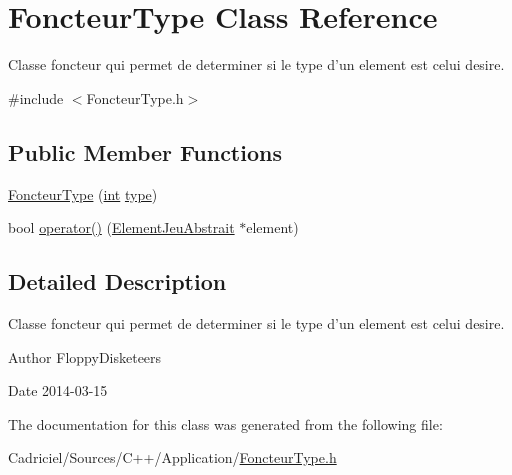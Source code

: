 \hypertarget{class_foncteur_type}{\section{Foncteur\-Type Class Reference}
\label{class_foncteur_type}
}


Classe foncteur qui permet de determiner si le type d'un element est celui desire.  




{\ttfamily \#include $<$Foncteur\-Type.\-h$>$}

\subsection*{Public Member Functions}
\begin{DoxyCompactItemize}
\item 
\hyperlink{group__inf2990_gafcde197bef3ec73b838a97b787605d46}{Foncteur\-Type} (\hyperlink{wglew_8h_a500a82aecba06f4550f6849b8099ca21}{int} \hyperlink{fmod_8h_a5338b9cb3874378d7e5adfbe80a8a381}{type})
\item 
bool \hyperlink{group__inf2990_ga133b99829c940832643aae8fc4b0dab7}{operator()} (\hyperlink{class_element_jeu_abstrait}{Element\-Jeu\-Abstrait} $\ast$element)
\end{DoxyCompactItemize}


\subsection{Detailed Description}
Classe foncteur qui permet de determiner si le type d'un element est celui desire. 

\begin{DoxyAuthor}{Author}
Floppy\-Disketeers 
\end{DoxyAuthor}
\begin{DoxyDate}{Date}
2014-\/03-\/15 
\end{DoxyDate}


The documentation for this class was generated from the following file\-:\begin{DoxyCompactItemize}
\item 
Cadriciel/\-Sources/\-C++/\-Application/\hyperlink{_foncteur_type_8h}{Foncteur\-Type.\-h}\end{DoxyCompactItemize}
